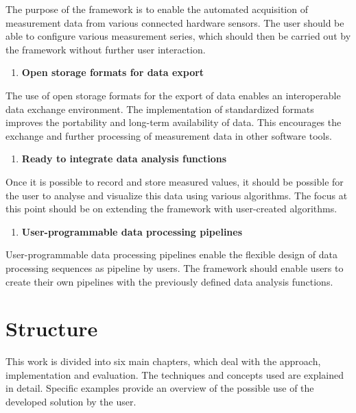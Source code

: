 The purpose of the framework is to enable the automated acquisition of
measurement data from various connected hardware sensors. The user
should be able to configure various measurement series, which should
then be carried out by the framework without further user interaction.

\begin{enumerate}
\def\labelenumi{\arabic{enumi}.}
\setcounter{enumi}{2}
\tightlist
\item
  \textbf{Open storage formats for data export}
\end{enumerate}

The use of open storage formats for the export of data enables an
interoperable data exchange environment. The implementation of
standardized formats improves the portability and long-term availability
of data. This encourages the exchange and further processing of
measurement data in other software tools.

\begin{enumerate}
\def\labelenumi{\arabic{enumi}.}
\setcounter{enumi}{3}
\tightlist
\item
  \textbf{Ready to integrate data analysis functions}
\end{enumerate}

Once it is possible to record and store measured values, it should be
possible for the user to analyse and visualize this data using various
algorithms. The focus at this point should be on extending the framework
with user-created algorithms.

\newpage

\begin{enumerate}
\def\labelenumi{\arabic{enumi}.}
\setcounter{enumi}{4}
\tightlist
\item
  \textbf{User-programmable data processing pipelines}
\end{enumerate}

User-programmable data processing pipelines enable the flexible design
of data processing sequences as pipeline by users. The framework should
enable users to create their own pipelines with the previously defined
data analysis functions.

\hypertarget{structure}{%
\section{Structure}\label{structure}}

This work is divided into six main chapters, which deal with the
approach, implementation and evaluation. The techniques and concepts
used are explained in detail. Specific examples provide an overview of
the possible use of the developed solution by the user.

